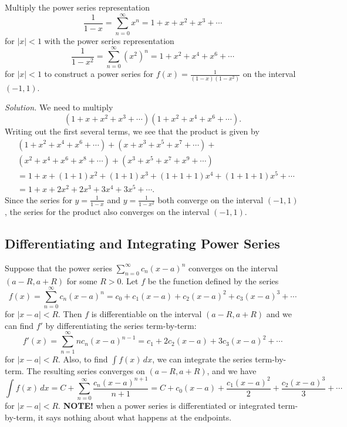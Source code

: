 \documentclass{report}
\begin{document}
    \bigbreak \noindent 
    \begin{exm}
        Multiply the power series representation
        \[
        \frac{1}{1 - x} = \sum_{n=0}^{\infty} x^n = 1 + x + x^2 + x^3 + \cdots
        \]
        for \( |x| < 1 \) with the power series representation
        \[
        \frac{1}{1 - x^2} = \sum_{n=0}^{\infty} (x^2)^n = 1 + x^2 + x^4 + x^6 + \cdots
        \]
        for \( |x| < 1 \) to construct a power series for \( f(x) = \frac{1}{(1 - x)(1 - x^2)} \) on the interval \( (-1, 1) \).
    \end{exm}
    \bigbreak \noindent 
    \textit{Solution.} 
    We need to multiply
    \[
    (1 + x + x^2 + x^3 + \cdots)(1 + x^2 + x^4 + x^6 + \cdots).
    \]
    Writing out the first several terms, we see that the product is given by
    \[
    \begin{aligned}
    &(1 + x^2 + x^4 + x^6 + \cdots) + (x + x^3 + x^5 + x^7 + \cdots) + \\
    &(x^2 + x^4 + x^6 + x^8 + \cdots) + (x^3 + x^5 + x^7 + x^9 + \cdots) \\
    &= 1 + x + (1 + 1)x^2 + (1 + 1)x^3 + (1 + 1 + 1)x^4 + (1 + 1 + 1)x^5 + \cdots \\
    &= 1 + x + 2x^2 + 2x^3 + 3x^4 + 3x^5 + \cdots.
    \end{aligned}
    \]
    Since the series for \( y = \frac{1}{1 - x} \) and \( y = \frac{1}{1 - x^2} \) both converge on the interval \( (-1, 1) \), the series for the product also converges on the interval \( (-1, 1) \).


    \pagebreak 
    \subsection*{Differentiating and Integrating Power Series}
    \bigbreak \noindent 
    \begin{thrmm}
         Suppose that the power series $\sum_{n=0}^{\infty} c_n (x - a)^n$ converges on the interval $(a - R, a + R)$ for some $R > 0$. Let $f$ be the function defined by the series
        \[
        f(x) = \sum_{n=0}^{\infty} c_n (x - a)^n = c_0 + c_1(x - a) + c_2(x - a)^2 + c_3(x - a)^3 + \cdots
        \]
        for $|x - a| < R$. Then $f$ is differentiable on the interval $(a - R, a + R)$ and we can find $f'$ by differentiating the series term-by-term:
        \[
        f'(x) = \sum_{n=1}^{\infty} n c_n (x - a)^{n-1} = c_1 + 2c_2(x - a) + 3c_3(x - a)^2 + \cdots
        \]
        for $|x - a| < R$. Also, to find $\int f(x) \, dx$, we can integrate the series term-by-term. The resulting series converges on $(a - R, a + R)$, and we have
        \[
        \int f(x) \, dx = C + \sum_{n=0}^{\infty} \frac{c_n (x - a)^{n+1}}{n+1} = C + c_0(x - a) + \frac{c_1(x - a)^2}{2} + \frac{c_2(x - a)^3}{3} + \cdots
        \]
        for $|x - a| < R$.
        \bigbreak \noindent 
        \textbf{NOTE!} when a power series is differentiated or integrated term-by-term, it says nothing about what happens at the endpoints.
    \end{thrmm}
\end{document}

